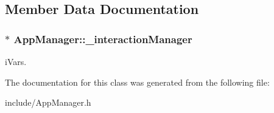\subsection{Member Data Documentation}
\hypertarget{class_app_manager_a1b14712d9464915505b8e5b2153e76de}{
\subsubsection[{\_\-interactionManager}]{$\ast$ {\bf AppManager::\_\-interactionManager}}}
\label{class_app_manager_a1b14712d9464915505b8e5b2153e76de}
iVars. 

The documentation for this class was generated from the following file:\begin{DoxyCompactItemize}
\item 
include/AppManager.h\end{DoxyCompactItemize}
